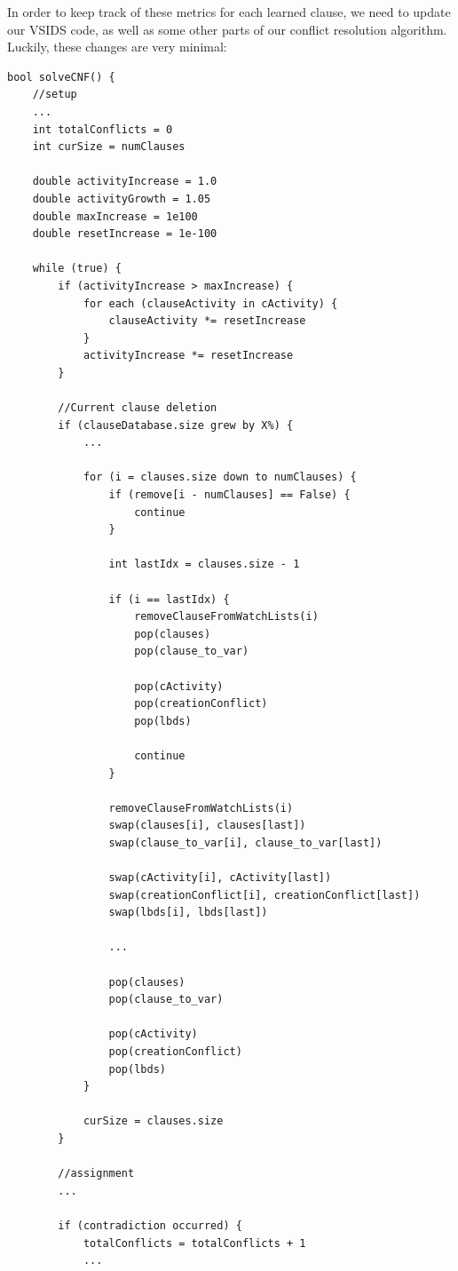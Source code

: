 \documentclass[../main.tex]{subfiles}
\begin{document}
In order to keep track of these metrics for each learned clause, we need to update our 
VSIDS code, as well as some other parts of our conflict resolution algorithm. Luckily, 
these changes are very minimal:
\begin{lstlisting}
bool solveCNF() {
    //setup
    ...
    int totalConflicts = 0
    int curSize = numClauses

    double activityIncrease = 1.0
    double activityGrowth = 1.05
    double maxIncrease = 1e100
    double resetIncrease = 1e-100

    while (true) {
        if (activityIncrease > maxIncrease) {
            for each (clauseActivity in cActivity) {
                clauseActivity *= resetIncrease
            }
            activityIncrease *= resetIncrease
        }

        //Current clause deletion
        if (clauseDatabase.size grew by X%) {
            ...

            for (i = clauses.size down to numClauses) {
                if (remove[i - numClauses] == False) {
                    continue
                }

                int lastIdx = clauses.size - 1

                if (i == lastIdx) {
                    removeClauseFromWatchLists(i)
                    pop(clauses)
                    pop(clause_to_var)

                    pop(cActivity)
                    pop(creationConflict)
                    pop(lbds)

                    continue
                }

                removeClauseFromWatchLists(i)
                swap(clauses[i], clauses[last])
                swap(clause_to_var[i], clause_to_var[last])

                swap(cActivity[i], cActivity[last])
                swap(creationConflict[i], creationConflict[last])
                swap(lbds[i], lbds[last])

                ...

                pop(clauses)
                pop(clause_to_var)

                pop(cActivity)
                pop(creationConflict)
                pop(lbds)
            }

            curSize = clauses.size
        }

        //assignment
        ...

        if (contradiction occurred) {
            totalConflicts = totalConflicts + 1
            ...


\end{lstlisting}
\end{document}
